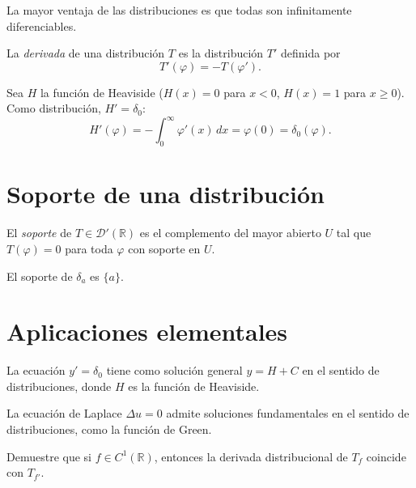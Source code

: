 La mayor ventaja de las distribuciones es que todas son infinitamente diferenciables.

\begin{definition}
\label{def:derivada-distribucion}
La \emph{derivada} de una distribución $T$ es la distribución $T'$ definida por
\[
  T'(\varphi)=-T(\varphi').
\]
\end{definition}

\begin{example}
\label{ej:derivada-heaviside}
Sea $H$ la función de Heaviside ($H(x)=0$ para $x<0$, $H(x)=1$ para $x\geq 0$). Como distribución, $H'=\delta_0$:
\[
  H'(\varphi)=-\int_0^{\infty}\varphi'(x)\,dx=\varphi(0)=\delta_0(\varphi).
\]
\end{example}

\section{Soporte de una distribución}

\begin{definition}
\label{def:soporte-distribucion}
El \emph{soporte} de $T\in\mathcal{D}'(\mathbb{R})$ es el complemento del mayor abierto $U$ tal que $T(\varphi)=0$ para toda $\varphi$ con soporte en $U$.
\end{definition}

\begin{example}
El soporte de $\delta_a$ es $\{a\}$.
\end{example}

\section{Aplicaciones elementales}

\begin{example}
\label{ej:edo-distribuciones}
La ecuación $y'=\delta_0$ tiene como solución general $y=H+C$ en el sentido de distribuciones, donde $H$ es la función de Heaviside.
\end{example}

\begin{example}
\label{ej:edp-distribuciones}
La ecuación de Laplace $\Delta u=0$ admite soluciones fundamentales en el sentido de distribuciones, como la función de Green.
\end{example}

\begin{exercise}
Demuestre que si $f\in C^1(\mathbb{R})$, entonces la derivada distribucional de $T_f$ coincide con $T_{f'}$.
\end{exercise}

